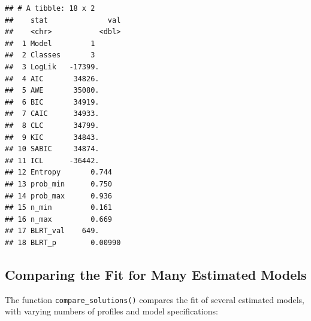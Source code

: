 \documentclass[man]{apa6}
\newenvironment{Shaded}{\begin{snugshade}}{\end{snugshade}}
\newcommand{\DataTypeTok}[1]{\textcolor[rgb]{0.13,0.29,0.53}{#1}}
\newcommand{\DecValTok}[1]{\textcolor[rgb]{0.00,0.00,0.81}{#1}}
\newcommand{\KeywordTok}[1]{\textcolor[rgb]{0.13,0.29,0.53}{\textbf{#1}}}
\newcommand{\NormalTok}[1]{#1}
\newcommand{\OperatorTok}[1]{\textcolor[rgb]{0.81,0.36,0.00}{\textbf{#1}}}
\newcommand{\StringTok}[1]{\textcolor[rgb]{0.31,0.60,0.02}{#1}}
\begin{document}
\begin{Shaded}
\end{Shaded}

\begin{verbatim}
## # A tibble: 18 x 2
##    stat              val
##    <chr>           <dbl>
##  1 Model         1      
##  2 Classes       3      
##  3 LogLik   -17399.     
##  4 AIC       34826.     
##  5 AWE       35080.     
##  6 BIC       34919.     
##  7 CAIC      34933.     
##  8 CLC       34799.     
##  9 KIC       34843.     
## 10 SABIC     34874.     
## 11 ICL      -36442.     
## 12 Entropy       0.744  
## 13 prob_min      0.750  
## 14 prob_max      0.936  
## 15 n_min         0.161  
## 16 n_max         0.669  
## 17 BLRT_val    649.     
## 18 BLRT_p        0.00990
\end{verbatim}

\hypertarget{comparing-the-fit-for-many-estimated-models}{%
\subsection{Comparing the Fit for Many Estimated Models}\label{comparing-the-fit-for-many-estimated-models}}

The function \texttt{compare\_solutions()} compares the fit of several estimated models,
with varying numbers of profiles and model specifications:

\begin{Shaded}
\end{Shaded}
\end{document}
